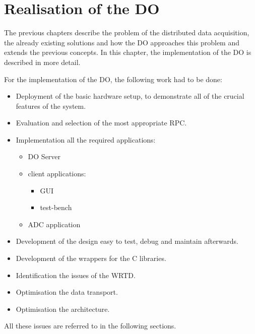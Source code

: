 



\chapter{Realisation of the DO}
The previous chapters describe the problem of the distributed data acquisition, the already existing solutions and how the DO approaches this problem and extends the previous concepts. In this chapter, the implementation of the DO is described in more detail.

For the implementation of the DO, the following work had to be done:
\begin{itemize}
    \item Deployment of the basic hardware setup, to demonstrate all of the crucial features of the system.
    \item Evaluation and selection of the most appropriate RPC.
    \item Implementation all the required applications:
    \begin{itemize}
        \item DO Server
        \item client applications:
        \begin{itemize}
            \item GUI
            \item test-bench
        \end{itemize}
        \item ADC application
    \end{itemize}
    \item Development of the design easy to test, debug and maintain afterwards.
    \item Development of the wrappers for the C libraries.
    \item Identification the issues of the WRTD.
    \item Optimisation the data transport.
    \item Optimisation the architecture.
\end{itemize}
All these issues are referred to in the following sections.


